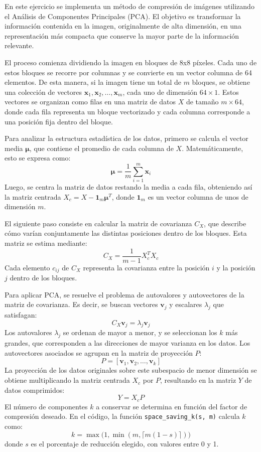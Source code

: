 \documentclass[a4paper,12pt]{article}
\begin{document}
En este ejercicio se implementa un método de compresión de imágenes utilizando el Análisis de Componentes Principales (PCA). El objetivo es transformar la información contenida en la imagen, originalmente de alta dimensión, en una representación más compacta que conserve la mayor parte de la información relevante.

\vspace{1em}

El proceso comienza dividiendo la imagen en bloques de 8x8 píxeles. Cada uno de estos bloques se recorre por columnas y se convierte en un vector columna de 64 elementos. De esta manera, si la imagen tiene un total de $m$ bloques, se obtiene una colección de vectores $\mathbf{x}_1, \mathbf{x}_2, \ldots, \mathbf{x}_m$, cada uno de dimensión $64 \times 1$. Estos vectores se organizan como filas en una matriz de datos $X$ de tamaño $m \times 64$, donde cada fila representa un bloque vectorizado y cada columna corresponde a una posición fija dentro del bloque.

\vspace{1em}

Para analizar la estructura estadística de los datos, primero se calcula el vector media $\boldsymbol{\mu}$, que contiene el promedio de cada columna de $X$. Matemáticamente, esto se expresa como:
\[
\boldsymbol{\mu} = \frac{1}{m} \sum_{i=1}^m \mathbf{x}_i
\]
Luego, se centra la matriz de datos restando la media a cada fila, obteniendo así la matriz centrada $X_c = X - \mathbf{1}_m \boldsymbol{\mu}^T$, donde $\mathbf{1}_m$ es un vector columna de unos de dimensión $m$.

\vspace{1em}

El siguiente paso consiste en calcular la matriz de covarianza $C_X$, que describe cómo varían conjuntamente las distintas posiciones dentro de los bloques. Esta matriz se estima mediante:
\[
C_X = \frac{1}{m-1} X_c^T X_c
\]
Cada elemento $c_{ij}$ de $C_X$ representa la covarianza entre la posición $i$ y la posición $j$ dentro de los bloques.

\vspace{1em}

Para aplicar PCA, se resuelve el problema de autovalores y autovectores de la matriz de covarianza. Es decir, se buscan vectores $\mathbf{v}_j$ y escalares $\lambda_j$ que satisfagan:
\[
C_X \mathbf{v}_j = \lambda_j \mathbf{v}_j
\]
Los autovalores $\lambda_j$ se ordenan de mayor a menor, y se seleccionan los $k$ más grandes, que corresponden a las direcciones de mayor varianza en los datos. Los autovectores asociados se agrupan en la matriz de proyección $P$:
\[
P = [\mathbf{v}_1, \mathbf{v}_2, \ldots, \mathbf{v}_k]
\]
La proyección de los datos originales sobre este subespacio de menor dimensión se obtiene multiplicando la matriz centrada $X_c$ por $P$, resultando en la matriz $Y$ de datos comprimidos:
\[
Y = X_c P
\]
El número de componentes $k$ a conservar se determina en función del factor de compresión deseado. En el código, la función \texttt{space\_saving\_k(s, m)} calcula $k$ como:
\[
k = \max\big(1, \min(m, \lceil m(1-s) \rceil)\big)
\]
donde $s$ es el porcentaje de reducción elegido, con valores entre 0 y 1.
\end{document}
